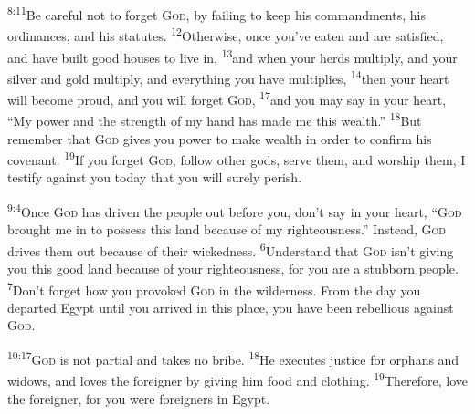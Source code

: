 \documentclass[openany,12pt,english]{book}
\newenvironment{para}{\par\pretolerance=100\tolerance=200\setlength{\emergencystretch}{0.6em}\relax}{\par}
\begin{document}
\begin{para}
    \textsuperscript{8:11}\thinspace{}Be care\-ful not to for\-get \textsc{God}, by fail\-ing to keep his commandments, his ordinances, and his statutes.
    \textsuperscript{12}\thinspace{}Oth\-er\-wise, once you've eat\-en and are sat\-is\-fied, and have built good hous\-es to live in,
    \textsuperscript{13}\thinspace{}and when your herds mul\-ti\-ply, and your sil\-ver and gold mul\-ti\-ply, and eve\-ry\-thing you have multiplies,
    \textsuperscript{14}\thinspace{}then your heart will be\-come proud, and you will for\-get \textsc{God},
    \textsuperscript{17}\thinspace{}and you may say in your heart, “My pow\-er and the strength of my hand has made me this wealth.”
    \textsuperscript{18}\thinspace{}But re\-mem\-ber that \textsc{God} gives you pow\-er to make wealth in or\-der to con\-firm his cov\-e\-nant.
    \textsuperscript{19}\thinspace{}If you for\-get \textsc{God}, fol\-low oth\-er gods, serve them, and wor\-ship them, I tes\-ti\-fy against you to\-day that you will sure\-ly per\-ish.
\end{para}

\bigskip{}

\begin{para}
    \textsuperscript{9:4}\thinspace{}Once \textsc{God} has driv\-en the peo\-ple out be\-fore you, don't say in your heart, “\textsc{God} brought me in to pos\-sess this land be\-cause of my right\-eous\-ness.” In\-stead, \textsc{God} drives them out be\-cause of their wick\-ed\-ness.
    \textsuperscript{6}\thinspace{}Un\-der\-stand that \textsc{God} is\-n't giv\-ing you this good land be\-cause of your right\-eous\-ness, for you are a stub\-born peo\-ple.
    \textsuperscript{7}\thinspace{}Don't for\-get how you pro\-voked \textsc{God} in the wil\-der\-ness. From the day you de\-part\-ed Egypt un\-til you ar\-rived in this place, you have been re\-bel\-lious against \textsc{God}.
\end{para}

\bigskip{}

\begin{para}
    \textsuperscript{10:17}\thinspace{}\textsc{God} is not par\-tial and takes no bribe.
    \textsuperscript{18}\thinspace{}He executes jus\-tice for orphans and widows, and loves the for\-eign\-er by giv\-ing him food and cloth\-ing.
    \textsuperscript{19}\thinspace{}There\-fore, love the for\-eign\-er, for you were foreigners in Egypt.
\end{para}

\bigskip{}
\end{document}
